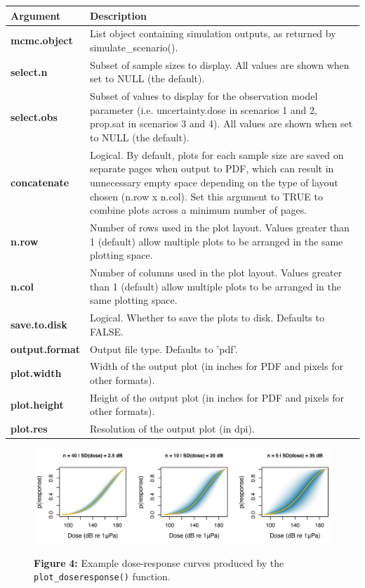 \documentclass[
]{article}
\begin{document}
\renewcommand{\arraystretch}{1.4}

\begin{longtable}{>{\bfseries}l|>{\raggedright\arraybackslash}p{30em}}
\toprule
\textbf{Argument} & \textbf{Description}\\
\midrule
mcmc.object & List object containing simulation outputs, as returned by simulate\_scenario().\\
select.n & Subset of sample sizes to display. All values are shown when set to NULL (the default).\\
select.obs & Subset of values to display for the observation model parameter (i.e. uncertainty.dose in scenarios 1 and 2, prop.sat in scenarios 3 and 4). All values are shown when set to NULL (the default).\\
concatenate & Logical. By default, plots for each sample size are saved on separate pages when output to PDF, which can result in unnecessary empty space depending on the type of layout chosen (n.row x n.col). Set this argument to TRUE to combine plots across a minimum number of pages.\\
n.row & Number of rows used in the plot layout. Values greater than 1 (default) allow multiple plots to be arranged in the same plotting space.\\
\addlinespace
n.col & Number of columns used in the plot layout. Values greater than 1 (default) allow multiple plots to be arranged in the same plotting space.\\
save.to.disk & Logical. Whether to save the plots to disk. Defaults to FALSE.\\
output.format & Output file type. Defaults to 'pdf'.\\
plot.width & Width of the output plot (in inches for PDF and pixels for other formats).\\
plot.height & Height of the output plot (in inches for PDF and pixels for other formats).\\
\addlinespace
plot.res & Resolution of the output plot (in dpi).\\
\bottomrule
\end{longtable}



\begin{figure}

{\centering \includegraphics[width=1\linewidth]{fig/fig_doseresponse_plots} 

}

\textbf{Figure }{\textbf{4:} \hypertarget{fig4}{}Example dose-response curves produced by the \texttt{plot\_doseresponse()} function.}\label{fig:unnamed-chunk-10}
\end{figure}
\end{document}
